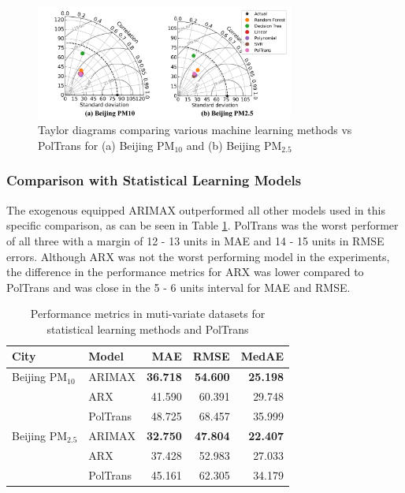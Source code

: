 \documentclass[twocolumn]{svjour3}          %
\begin{document}
\begin{figure}[h]
\centering
\includegraphics[width=8.5cm]{./merged_taylor_m_ml.png}
\caption{Taylor diagrams comparing various machine learning methods vs {PolTrans} for (a) Beijing PM${_{10}}$ and (b) Beijing PM${_{2.5}}$}
\label{fig:m_ml-taylor}
\end{figure}

\subsubsection{Comparison with Statistical Learning Models}

The exogenous equipped ARIMAX outperformed all other models used in this specific comparison, as can be seen in Table \ref{tbl:m_stat-performance}. {PolTrans} was the worst performer of all three with a margin of 12 - 13 units in MAE and 14 - 15 units in RMSE errors. Although ARX was not the worst performing model in the experiments, the difference in the performance metrics for ARX was lower compared to PolTrans and was close in the 5 - 6 units interval for MAE and RMSE.

\begin{table}[h]
\small
\centering
\tabcolsep=0.16cm
\caption{Performance metrics in muti-variate datasets for statistical learning methods and PolTrans}
\label{tbl:m_stat-performance}
\begin{tabular}{llrrr}
\toprule
City & Model & MAE & RMSE & MedAE \\
\midrule
Beijing PM${_{10}}$ & ARIMAX & \textbf{36.718} & \textbf{54.600} & \textbf{25.198} \\
& ARX & 41.590 & 60.391 & 29.748 \\
& PolTrans & 48.725 & 68.457 & 35.999 \\
Beijing PM${_{2.5}}$ & ARIMAX & \textbf{32.750} & \textbf{47.804} & \textbf{22.407} \\
& ARX & 37.428 & 52.983 & 27.033 \\
& PolTrans & 45.161 & 62.305 & 34.179 \\
\bottomrule
\end{tabular}
\end{table}
\end{document}
